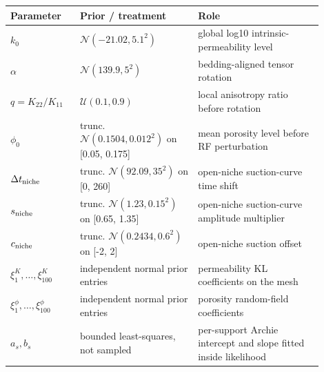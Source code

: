 \begin{tabular}{p{0.20\linewidth}p{0.34\linewidth}p{0.36\linewidth}}
\toprule
Parameter & Prior / treatment & Role \\
\midrule
$k_0$ & $\mathcal{N}(-21.02,5.1^2)$ & global log10 intrinsic-permeability level \\
$\alpha$ & $\mathcal{N}(139.9,5^2)$ & bedding-aligned tensor rotation \\
$q=K_{22}/K_{11}$ & $\mathcal{U}(0.1,0.9)$ & local anisotropy ratio before rotation \\
$\phi_0$ & trunc. $\mathcal{N}(0.1504,0.012^2)$ on [0.05, 0.175] & mean porosity level before RF perturbation \\
$\Delta t_{\rm niche}$ & trunc. $\mathcal{N}(92.09,35^2)$ on [0, 260] & open-niche suction-curve time shift \\
$s_{\rm niche}$ & trunc. $\mathcal{N}(1.23,0.15^2)$ on [0.65, 1.35] & open-niche suction-curve amplitude multiplier \\
$c_{\rm niche}$ & trunc. $\mathcal{N}(0.2434,0.6^2)$ on [-2, 2] & open-niche suction offset \\
$\xi^K_1,\ldots,\xi^K_{100}$ & independent normal prior entries & permeability KL coefficients on the mesh \\
$\xi^\phi_1,\ldots,\xi^\phi_{100}$ & independent normal prior entries & porosity random-field coefficients \\
$a_s,b_s$ & bounded least-squares, not sampled & per-support Archie intercept and slope fitted inside likelihood \\
\bottomrule
\end{tabular}
